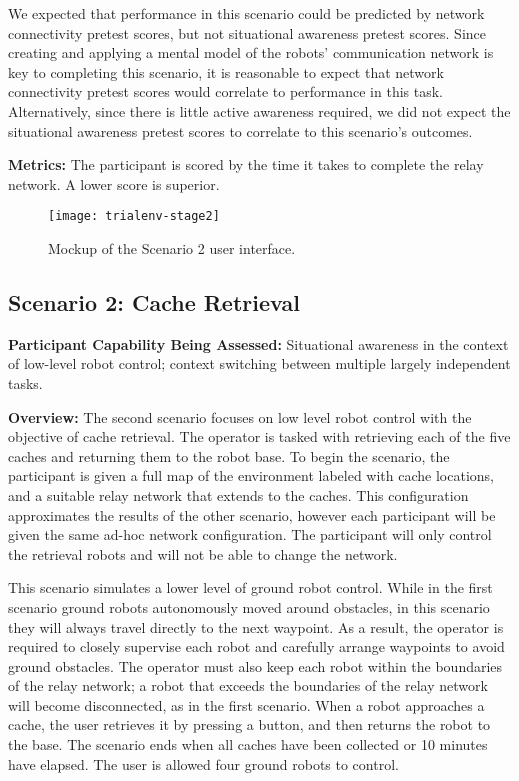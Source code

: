 \documentclass[letterpaper, 10 pt, conference]{ieeeconf}  %
\begin{document}
We expected that performance in this scenario could be predicted by network connectivity pretest scores, but not situational awareness pretest scores. Since creating and applying a mental model of the robots' communication network is key to completing this scenario, it is reasonable to expect that network connectivity pretest scores would correlate to performance in this task. Alternatively, since there is little active awareness required, we did not expect the situational awareness pretest scores to correlate to this scenario's outcomes.

\textbf{Metrics:} The participant is scored by the time it takes to complete the relay network. A lower score is superior.

\begin{figure}[h]
  \centering
  \texttt{[image: trialenv-stage2]}
  \caption{Mockup of the Scenario 2 user interface.}
\end{figure}

\subsection{Scenario 2: Cache Retrieval}

\textbf{Participant Capability Being Assessed:} Situational awareness in the context of low-level robot control; context switching between multiple largely independent tasks.

\textbf{Overview:} The second scenario focuses on low level robot control with the objective of cache retrieval.  The operator is tasked with retrieving each of the five caches and returning them to the robot base.  To begin the scenario, the participant is given a full map of the environment labeled with cache locations, and a suitable relay network that extends to the caches.  This configuration approximates the results of the other scenario, however each participant will be given the same ad-hoc network configuration.  The participant will only control the retrieval robots and will not be able to change the network.

This scenario simulates a lower level of ground robot control.  While in the first scenario ground robots autonomously moved around obstacles, in this scenario they will always travel directly to the next waypoint.  As a result, the operator is required to closely supervise each robot and carefully arrange waypoints to avoid ground obstacles.  The operator must also keep each robot within the boundaries of the relay network; a robot that exceeds the boundaries of the relay network will become disconnected, as in the first scenario.  When a robot approaches a cache, the user retrieves it by pressing a button, and then returns the robot to the base.  The scenario ends when all caches have been collected or 10 minutes have elapsed. The user is allowed four ground robots to control.
\end{document}
